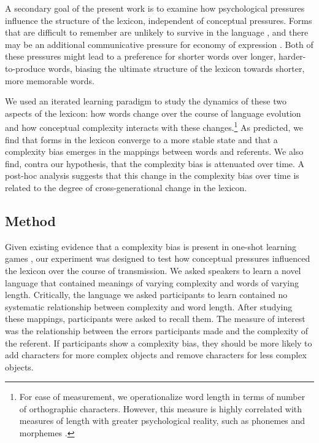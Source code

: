 A secondary goal of the present work is to examine how psychological pressures influence the structure of the lexicon, independent of conceptual pressures.  Forms that are difficult to remember are unlikely to survive in the language  \cite{christiansen2008}, and there may be an additional communicative pressure for economy of expression \cite{zipf1949human}. Both of these pressures might lead to a preference for shorter words over longer, harder-to-produce words, biasing the ultimate structure of the lexicon towards shorter, more memorable words. 

We used an iterated learning paradigm to study the dynamics of these two aspects of the lexicon: how  words change over the course of language evolution and how conceptual complexity interacts with these changes.\footnote{For ease of measurement, we operationalize word length in terms of number of orthographic characters. However, this measure is highly correlated with measures of length with greater psychological reality, such as phonemes and morphemes \cite{lewisstructure2014}.} As predicted, we find that forms in the lexicon converge to a more stable state and that a complexity bias emerges in the mappings between words and referents. We also find, contra our hypothesis, that the complexity bias is attenuated over time. A post-hoc analysis suggests that this change in the complexity bias over time is related to the degree of cross-generational change in the lexicon.


\subsection{Method}

Given existing evidence that a complexity bias is present in one-shot learning games \cite{lewisstructure2014}, our experiment was designed to test how conceptual pressures influenced the lexicon over the course of transmission. We asked speakers to learn a novel language that contained meanings of varying complexity and words of varying length. Critically, the language we asked participants to learn contained no systematic relationship between complexity and word length. After studying these mappings, participants were asked to recall them. The measure of interest was the relationship between the errors participants made and the complexity of the referent. If participants show a complexity bias, they should be more likely to add characters for more complex objects and remove characters for less complex objects. 

